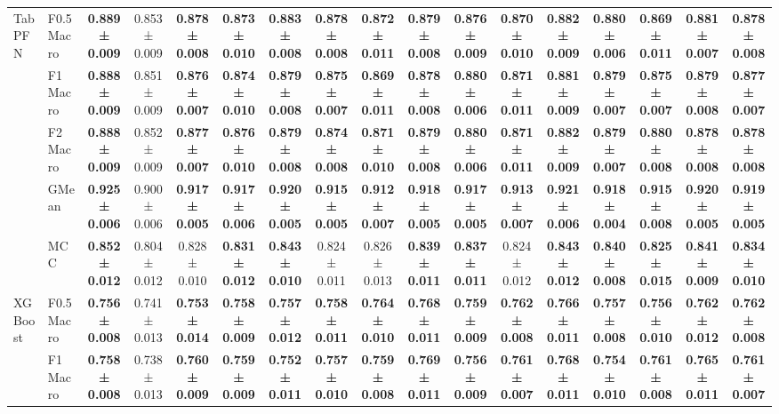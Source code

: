 \begin{table}[H]
{\begin{tabular}{llccccccccccccccc}
\cline{1-17}
\multirow[t]{5}{*}{TabPFN} & F0.5 Macro & \textbf{0.889 ± 0.009} & 0.853 ± 0.009 & \textbf{0.878 ± 0.008} & \textbf{0.873 ± 0.010} & \textbf{0.883 ± 0.008} & \textbf{0.878 ± 0.008} & \textbf{0.872 ± 0.011} & \textbf{0.879 ± 0.008} & \textbf{0.876 ± 0.009} & \textbf{0.870 ± 0.010} & \textbf{0.882 ± 0.009} & \textbf{0.880 ± 0.006} & \textbf{0.869 ± 0.011} & \textbf{0.881 ± 0.007} & \textbf{0.878 ± 0.008} \\
 & F1 Macro & \textbf{0.888 ± 0.009} & 0.851 ± 0.009 & \textbf{0.876 ± 0.007} & \textbf{0.874 ± 0.010} & \textbf{0.879 ± 0.008} & \textbf{0.875 ± 0.007} & \textbf{0.869 ± 0.011} & \textbf{0.878 ± 0.008} & \textbf{0.880 ± 0.006} & \textbf{0.871 ± 0.011} & \textbf{0.881 ± 0.009} & \textbf{0.879 ± 0.007} & \textbf{0.875 ± 0.007} & \textbf{0.879 ± 0.008} & \textbf{0.877 ± 0.007} \\
 & F2 Macro & \textbf{0.888 ± 0.009} & 0.852 ± 0.009 & \textbf{0.877 ± 0.007} & \textbf{0.876 ± 0.010} & \textbf{0.879 ± 0.008} & \textbf{0.874 ± 0.008} & \textbf{0.871 ± 0.010} & \textbf{0.879 ± 0.008} & \textbf{0.880 ± 0.006} & \textbf{0.871 ± 0.011} & \textbf{0.882 ± 0.009} & \textbf{0.879 ± 0.007} & \textbf{0.880 ± 0.008} & \textbf{0.878 ± 0.008} & \textbf{0.878 ± 0.008} \\
 & GMean & \textbf{0.925 ± 0.006} & 0.900 ± 0.006 & \textbf{0.917 ± 0.005} & \textbf{0.917 ± 0.006} & \textbf{0.920 ± 0.005} & \textbf{0.915 ± 0.005} & \textbf{0.912 ± 0.007} & \textbf{0.918 ± 0.005} & \textbf{0.917 ± 0.005} & \textbf{0.913 ± 0.007} & \textbf{0.921 ± 0.006} & \textbf{0.918 ± 0.004} & \textbf{0.915 ± 0.008} & \textbf{0.920 ± 0.005} & \textbf{0.919 ± 0.005} \\
 & MCC & \textbf{0.852 ± 0.012} & 0.804 ± 0.012 & 0.828 ± 0.010 & \textbf{0.831 ± 0.012} & \textbf{0.843 ± 0.010} & 0.824 ± 0.011 & 0.826 ± 0.013 & \textbf{0.839 ± 0.011} & \textbf{0.837 ± 0.011} & 0.824 ± 0.012 & \textbf{0.843 ± 0.012} & \textbf{0.840 ± 0.008} & \textbf{0.825 ± 0.015} & \textbf{0.841 ± 0.009} & \textbf{0.834 ± 0.010} \\
\cline{1-17}
\multirow[t]{5}{*}{XGBoost} & F0.5 Macro & \textbf{0.756 ± 0.008} & 0.741 ± 0.013 & \textbf{0.753 ± 0.014} & \textbf{0.758 ± 0.009} & \textbf{0.757 ± 0.012} & \textbf{0.758 ± 0.011} & \textbf{0.764 ± 0.010} & \textbf{0.768 ± 0.011} & \textbf{0.759 ± 0.009} & \textbf{0.762 ± 0.008} & \textbf{0.766 ± 0.011} & \textbf{0.757 ± 0.008} & \textbf{0.756 ± 0.010} & \textbf{0.762 ± 0.012} & \textbf{0.762 ± 0.008} \\
 & F1 Macro & \textbf{0.758 ± 0.008} & 0.738 ± 0.013 & \textbf{0.760 ± 0.009} & \textbf{0.759 ± 0.009} & \textbf{0.752 ± 0.011} & \textbf{0.757 ± 0.010} & \textbf{0.759 ± 0.008} & \textbf{0.769 ± 0.011} & \textbf{0.756 ± 0.009} & \textbf{0.761 ± 0.007} & \textbf{0.768 ± 0.011} & \textbf{0.754 ± 0.010} & \textbf{0.761 ± 0.008} & \textbf{0.765 ± 0.011} & \textbf{0.761 ± 0.007} \\

\end{tabular}}
\end{table}

